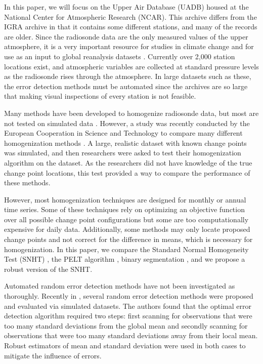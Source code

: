 \documentclass[12pt]{article}
\begin{document}
\begin{doublespacing}
In this paper, we will focus on the Upper Air Database (UADB) housed at the National Center for Atmospheric Research (NCAR). This archive differs from the IGRA archive in that it contains some different stations, and many of the records are older. Since the radiosonde data are the only measured values of the upper atmosphere, it is a very important resource for studies in climate change \cite{elliott91, eskridge95} and for use as an input to global reanalysis datasets \cite{kalnay96, kanamitsu02}. Currently over 2,000 station locations exist, and atmospheric variables are collected at standard pressure levels as the radiosonde rises through the atmosphere. In large datasets such as these, the error detection methods must be automated since the archives are so large that making visual inspections of every station is not feasible.

Many methods have been developed to homogenize radiosonde data, but most are not tested on simulated data \cite{eskridge95,haimberger08,haimberger07,lanzante96,lanzante03,venema12}.  However, a study was recently conducted by the European Cooperation in Science and Technology to compare many different homogenization methods \cite{venema12}.  A large, realistic dataset with known change points was simulated, and then researchers were asked to test their homogenization algorithm on the dataset.  As the researchers did not have knowledge of the true change point locations, this test provided a way to compare the performance of  these  methods.  

However, most homogenization techniques are designed for monthly or annual time series.  Some of these techniques rely on optimizing an objective function over all possible change point configurations \cite{scott74, killick12, lu10, li14} but some are too computationally expensive for daily data.  Additionally, some methods may only locate proposed change points and not correct for the difference in means, which is necessary for homogenization.  In this paper, we compare the Standard Normal Homogeneity Test (SNHT) \cite{alexandersson86}, the PELT algorithm \cite{killick12}, binary segmentation \cite{scott74}, and we propose a robust version of the SNHT.

Automated random error detection methods have not been investigated as thoroughly.  Recently in \cite{bell14}, several random error detection methods were proposed and evaluated via simulated datasets.  The authors found that the optimal error detection algorithm required two steps: first scanning for observations that were too many standard deviations from the global mean and secondly scanning for observations that were too many standard deviations away from their local mean.  Robust estimators of mean and standard deviation were used in both cases to mitigate the influence of errors.


\end{doublespacing}
\end{document}
